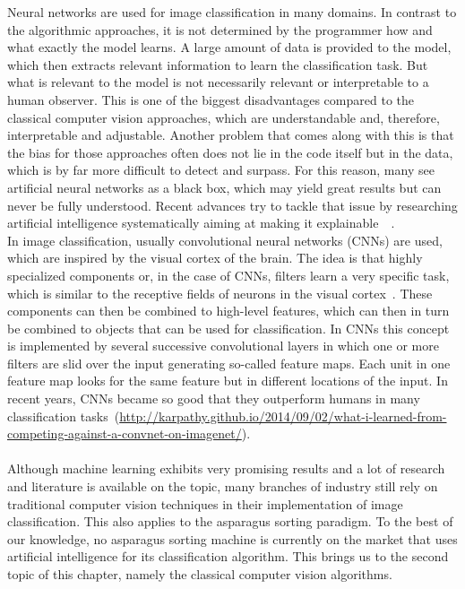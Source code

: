 Neural networks are used for image classification in many domains. In contrast to the algorithmic approaches, it is not determined by the programmer how and what exactly the model learns. A large amount of data is provided to the model, which then extracts relevant information to learn the classification task. But what is relevant to the model is not necessarily relevant or interpretable to a human observer. This is one of the biggest disadvantages compared to the classical computer vision approaches, which are understandable and, therefore, interpretable and adjustable. Another problem that comes along with this is that the bias for those approaches often does not lie in the code itself but in the data, which is by far more difficult to detect and surpass. For this reason, many see artificial neural networks as a black box, which may yield great results but can never be fully understood. Recent advances try to tackle that issue by researching artificial intelligence systematically aiming at making it explainable~\citep{tjoa2019survey}~\citep{gilpin2018explaining}. \\
In image classification, usually convolutional neural networks (CNNs) are used, which are inspired by the visual cortex of the brain. The idea is that highly specialized components or, in the case of CNNs, filters learn a very specific task, which is similar to the receptive fields of neurons in the visual cortex~\citep{hubel1962receptive}. These components can then be combined to high-level features, which can then in turn be combined to objects that can be used for classification. In CNNs this concept is implemented by several successive convolutional layers in which one or more filters are slid over the input generating so-called feature maps. Each unit in one feature map looks for the same feature but in different locations of the input. In recent years, CNNs became so good that they outperform humans in many classification tasks~\citep{russakovsky2015imagenet}(\url{http://karpathy.github.io/2014/09/02/what-i-learned-from-competing-against-a-convnet-on-imagenet/}). \\
\\
Although machine learning exhibits very promising results and a lot of research and literature is available on the topic, many branches of industry still rely on traditional computer vision techniques in their implementation of image classification. This also applies to the asparagus sorting paradigm. To the best of our knowledge, no asparagus sorting machine is currently on the market that uses artificial intelligence for its classification algorithm. This brings us to the second topic of this chapter, namely the classical computer vision algorithms. \\
